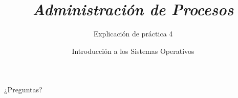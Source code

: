 


\author{Introducción a los Sistemas Operativos}



\title{\textit{Administración de Procesos}}
\subtitle{Explicación de práctica 4}
\begin{frame}
  \titlepage
\end{frame}



\begin{frame}{}
  \begin{center}
    \vfill
    \huge ¿Preguntas?
    \vfill
  \end{center}
\end{frame}


